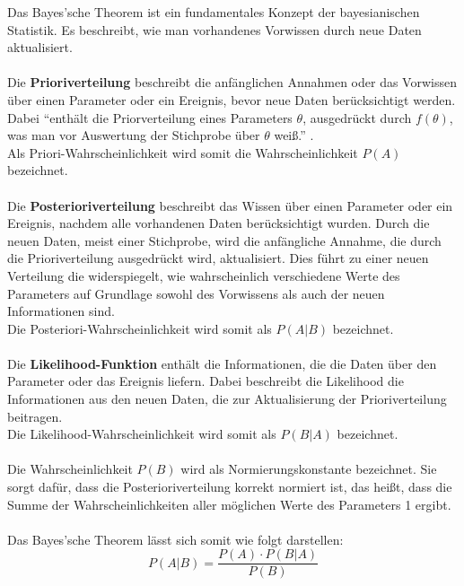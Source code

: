 \documentclass[a4paper,12pt]{article}
\begin{document}
Das Bayes'sche Theorem ist ein fundamentales Konzept der bayesianischen Statistik. Es beschreibt, wie man vorhandenes Vorwissen durch neue Daten aktualisiert. \\\\
Die \textbf{Prioriverteilung} beschreibt die anfänglichen Annahmen oder das Vorwissen über einen 
Parameter oder ein Ereignis, bevor neue Daten berücksichtigt werden.
Dabei ``enthält die Priorverteilung eines Parameters $\theta$, ausgedrückt durch $f (\theta) $, 
was man vor Auswertung der Stichprobe über $\theta$ weiß.'' \parencite[90]{StatistikKlassischOderBayes}. \\
Als Priori-Wahrscheinlichkeit wird somit die Wahrscheinlichkeit $ P(A) $ bezeichnet. \\\\
Die \textbf{Posterioriverteilung} beschreibt das Wissen über einen Parameter oder ein Ereignis, nachdem alle 
vorhandenen Daten berücksichtigt wurden. Durch die neuen Daten, meist einer Stichprobe, wird die 
anfängliche Annahme, die durch die Prioriverteilung ausgedrückt wird, aktualisiert. 
Dies führt zu einer neuen Verteilung die widerspiegelt, wie wahrscheinlich verschiedene Werte 
des Parameters auf Grundlage sowohl des Vorwissens als auch der neuen Informationen sind. \parencite[109]{StatistikKlassischOderBayes}\\
Die Posteriori-Wahrscheinlichkeit wird somit als $ P(A|B) $ bezeichnet. \\\\
Die \textbf{Likelihood-Funktion} enthält die Informationen, die die Daten über den Parameter oder das Ereignis liefern.
Dabei beschreibt die Likelihood die Informationen aus den neuen Daten, die zur Aktualisierung der Prioriverteilung beitragen. \parencite[88]{StatistikKlassischOderBayes}\\
Die Likelihood-Wahrscheinlichkeit wird somit als $ P(B|A) $ bezeichnet. \\\\
Die Wahrscheinlichkeit $ P(B) $ wird als Normierungskonstante bezeichnet. Sie sorgt dafür, 
dass die Posterioriverteilung korrekt normiert ist, das heißt, dass die Summe der 
Wahrscheinlichkeiten aller möglichen Werte des Parameters 1 ergibt. \parencite[109]{StatistikKlassischOderBayes} \\\\
Das Bayes'sche Theorem lässt sich somit wie folgt darstellen:
\begin{equation}
P(A|B) = \frac{P(A) \cdot P(B|A)}{P(B)}
\end{equation}
\end{document}
